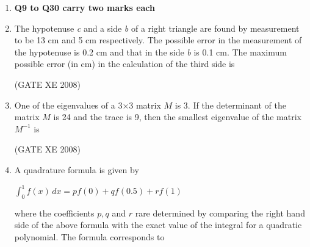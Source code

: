 \documentclass[12pt]{article}
\begin{document}
\begin{enumerate}
\begin{enumerate}
\end{enumerate}

(GATE XE 2008)

\item []\textbf{Q9 to Q30 carry two marks each}
\item  The hypotenuse \textit{c} and a side \textit{b} of a right triangle are found by measurement to be 13 cm and 5 cm respectively. The possible error in the measurement of the hypotenuse is 0.2 cm and that in the side \textit{b} is 0.1 cm. The maximum possible error (in cm) in the calculation of the third side is

\begin{enumerate}
\end{enumerate}

(GATE XE 2008)
\item One of the eigenvalues of a 3×3 matrix $M$ is 3. If the determinant of the matrix $M$ is 24 and the trace is 9, then the smallest eigenvalue of the matrix $M^{-1}$ is

\begin{enumerate}
\end{enumerate}

(GATE XE 2008)
\item  A quadrature formula is given by\begin{center} $\int_{0}^{1} f(x) \,dx =pf(0) + qf(0.5) +rf(1)$\end{center} where the coefficients $p,q$ and $r$ rare determined by comparing the right hand side of the above formula with the exact value of the integral for a quadratic polynomial. The formula corresponds to


\end{enumerate}
\end{document}
